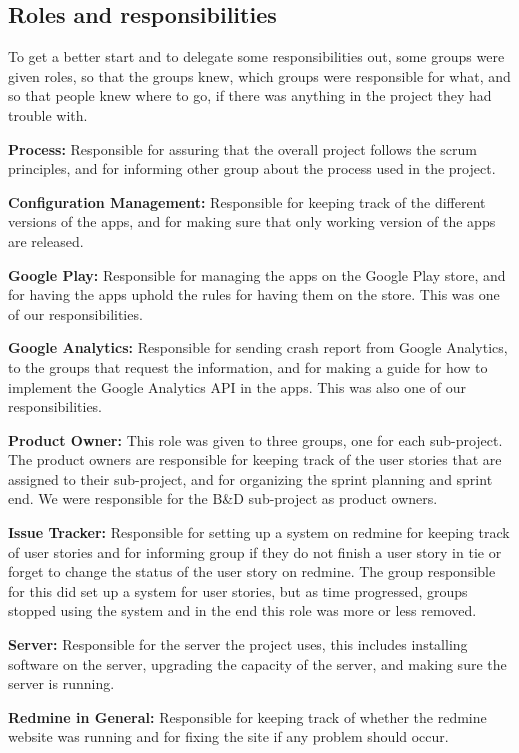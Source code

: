 \subsection{Roles and responsibilities}
To get a better start and to delegate some responsibilities out, some groups were given roles, so that the groups knew, which groups were responsible for what, and so that people knew where to go, if there was anything in the project they had trouble with.


\textbf{Process:}
Responsible for assuring that the overall project follows the scrum principles, and for informing other group about the process used in the project.

\textbf{Configuration Management:}
Responsible for keeping track of the different versions of the apps, and for making sure that only working version of the apps are released.

\textbf{Google Play:}
Responsible for managing the apps on the Google Play store, and for having the apps uphold the rules for having them on the store. This was one of our responsibilities.

\textbf{Google Analytics:}
Responsible for sending crash report from Google Analytics, to the groups that request the information, and for making a guide for how to implement the Google Analytics API in the apps. This was also one of our responsibilities.

\textbf{Product Owner:}
This role was given to three groups, one for each sub-project. The product owners are responsible for keeping track of the user stories that are assigned to their sub-project, and for organizing the sprint planning and sprint end. We were responsible for the B\&D sub-project as product owners.

\textbf{Issue Tracker:}
Responsible for setting up a system on redmine for keeping track of user stories and for informing group if they do not finish a user story in tie or forget to change the status of the user story on redmine. The group responsible for this did set up a system for user stories, but as time progressed, groups stopped using the system and in the end this role was more or less removed.

\textbf{Server:}
Responsible for the server the project uses, this includes installing software on the server, upgrading the capacity of the server, and making sure the server is running.

\textbf{Redmine in General:}
Responsible for keeping track of whether the redmine website was running and for fixing the site if any problem should occur.


